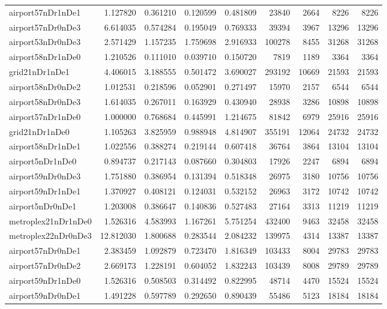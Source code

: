 \begin{longtable}{|l|r|r|r|r|r|r|r|r|}
airport57nDr1nDe1 & 1.127820 & 0.361210 & 0.120599 & 0.481809 & 23840 & 2664 & 8226 & 8226 \\
airport57nDr0nDe3 & 6.614035 & 0.574284 & 0.195049 & 0.769333 & 39394 & 3967 & 13296 & 13296 \\
airport53nDr0nDe3 & 2.571429 & 1.157235 & 1.759698 & 2.916933 & 100278 & 8455 & 31268 & 31268 \\
airport58nDr1nDe0 & 1.210526 & 0.111010 & 0.039710 & 0.150720 & 7819 & 1189 & 3364 & 3364 \\
grid21nDr1nDe1 & 4.406015 & 3.188555 & 0.501472 & 3.690027 & 293192 & 10669 & 21593 & 21593 \\
airport58nDr0nDe2 & 1.012531 & 0.218596 & 0.052901 & 0.271497 & 15970 & 2157 & 6544 & 6544 \\
airport58nDr0nDe3 & 1.614035 & 0.267011 & 0.163929 & 0.430940 & 28938 & 3286 & 10898 & 10898 \\
airport57nDr1nDe0 & 1.000000 & 0.768684 & 0.445991 & 1.214675 & 81842 & 6979 & 25916 & 25916 \\
grid21nDr1nDe0 & 1.105263 & 3.825959 & 0.988948 & 4.814907 & 355191 & 12064 & 24732 & 24732 \\
airport58nDr1nDe1 & 1.022556 & 0.388274 & 0.219144 & 0.607418 & 36764 & 3864 & 13104 & 13104 \\
airport5nDr1nDe0 & 0.894737 & 0.217143 & 0.087660 & 0.304803 & 17926 & 2247 & 6894 & 6894 \\
airport59nDr0nDe3 & 1.751880 & 0.386954 & 0.131394 & 0.518348 & 26975 & 3180 & 10756 & 10756 \\
airport59nDr1nDe1 & 1.370927 & 0.408121 & 0.124031 & 0.532152 & 26963 & 3172 & 10742 & 10742 \\
airport5nDr0nDe1 & 1.203008 & 0.386647 & 0.140836 & 0.527483 & 27164 & 3313 & 11219 & 11219 \\
metroplex21nDr1nDe0 & 1.526316 & 4.583993 & 1.167261 & 5.751254 & 432400 & 9463 & 32458 & 32458 \\
metroplex22nDr0nDe3 & 12.812030 & 1.800688 & 0.283544 & 2.084232 & 139975 & 4314 & 13387 & 13387 \\
airport57nDr0nDe1 & 2.383459 & 1.092879 & 0.723470 & 1.816349 & 103433 & 8004 & 29783 & 29783 \\
airport57nDr0nDe2 & 2.669173 & 1.228191 & 0.604052 & 1.832243 & 103439 & 8008 & 29789 & 29789 \\
airport59nDr1nDe0 & 1.526316 & 0.508503 & 0.314492 & 0.822995 & 48714 & 4470 & 15524 & 15524 \\
airport59nDr0nDe1 & 1.491228 & 0.597789 & 0.292650 & 0.890439 & 55486 & 5123 & 18184 & 18184 \\

\end{longtable}
